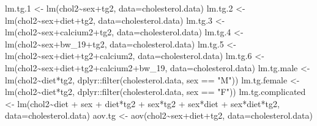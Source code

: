 \documentclass[
]{article}
\newenvironment{Shaded}{\begin{snugshade}}{\end{snugshade}}
\newcommand{\AttributeTok}[1]{\textcolor[rgb]{0.77,0.63,0.00}{#1}}
\newcommand{\FloatTok}[1]{\textcolor[rgb]{0.00,0.00,0.81}{#1}}
\newcommand{\FunctionTok}[1]{\textcolor[rgb]{0.00,0.00,0.00}{#1}}
\newcommand{\NormalTok}[1]{#1}
\newcommand{\OtherTok}[1]{\textcolor[rgb]{0.56,0.35,0.01}{#1}}
\newcommand{\SpecialCharTok}[1]{\textcolor[rgb]{0.00,0.00,0.00}{#1}}
\newcommand{\StringTok}[1]{\textcolor[rgb]{0.31,0.60,0.02}{#1}}
\begin{document}
\begin{Shaded}
\begin{Highlighting}[]
\NormalTok{lm.tg}\FloatTok{.1} \OtherTok{\textless{}{-}} \FunctionTok{lm}\NormalTok{(chol2}\SpecialCharTok{\textasciitilde{}}\NormalTok{sex}\SpecialCharTok{+}\NormalTok{tg2, }\AttributeTok{data=}\NormalTok{cholesterol.data)}
\NormalTok{lm.tg}\FloatTok{.2} \OtherTok{\textless{}{-}} \FunctionTok{lm}\NormalTok{(chol2}\SpecialCharTok{\textasciitilde{}}\NormalTok{sex}\SpecialCharTok{+}\NormalTok{diet}\SpecialCharTok{+}\NormalTok{tg2, }\AttributeTok{data=}\NormalTok{cholesterol.data)}
\NormalTok{lm.tg}\FloatTok{.3} \OtherTok{\textless{}{-}} \FunctionTok{lm}\NormalTok{(chol2}\SpecialCharTok{\textasciitilde{}}\NormalTok{sex}\SpecialCharTok{+}\NormalTok{calcium2}\SpecialCharTok{+}\NormalTok{tg2, }\AttributeTok{data=}\NormalTok{cholesterol.data)}
\NormalTok{lm.tg}\FloatTok{.4} \OtherTok{\textless{}{-}} \FunctionTok{lm}\NormalTok{(chol2}\SpecialCharTok{\textasciitilde{}}\NormalTok{sex}\SpecialCharTok{+}\NormalTok{bw\_19}\SpecialCharTok{+}\NormalTok{tg2, }\AttributeTok{data=}\NormalTok{cholesterol.data)}
\NormalTok{lm.tg}\FloatTok{.5} \OtherTok{\textless{}{-}} \FunctionTok{lm}\NormalTok{(chol2}\SpecialCharTok{\textasciitilde{}}\NormalTok{sex}\SpecialCharTok{+}\NormalTok{diet}\SpecialCharTok{+}\NormalTok{tg2}\SpecialCharTok{+}\NormalTok{calcium2, }\AttributeTok{data=}\NormalTok{cholesterol.data)}
\NormalTok{lm.tg}\FloatTok{.6} \OtherTok{\textless{}{-}} \FunctionTok{lm}\NormalTok{(chol2}\SpecialCharTok{\textasciitilde{}}\NormalTok{sex}\SpecialCharTok{+}\NormalTok{diet}\SpecialCharTok{+}\NormalTok{tg2}\SpecialCharTok{+}\NormalTok{calcium2}\SpecialCharTok{+}\NormalTok{bw\_19, }\AttributeTok{data=}\NormalTok{cholesterol.data)}
\NormalTok{lm.tg.male }\OtherTok{\textless{}{-}} \FunctionTok{lm}\NormalTok{(chol2}\SpecialCharTok{\textasciitilde{}}\NormalTok{diet}\SpecialCharTok{*}\NormalTok{tg2, dplyr}\SpecialCharTok{::}\FunctionTok{filter}\NormalTok{(cholesterol.data, sex }\SpecialCharTok{==} \StringTok{"M"}\NormalTok{))}
\NormalTok{lm.tg.female }\OtherTok{\textless{}{-}} \FunctionTok{lm}\NormalTok{(chol2}\SpecialCharTok{\textasciitilde{}}\NormalTok{diet}\SpecialCharTok{*}\NormalTok{tg2, dplyr}\SpecialCharTok{::}\FunctionTok{filter}\NormalTok{(cholesterol.data, sex }\SpecialCharTok{==} \StringTok{"F"}\NormalTok{))}
\NormalTok{lm.tg.complicated }\OtherTok{\textless{}{-}} \FunctionTok{lm}\NormalTok{(chol2}\SpecialCharTok{\textasciitilde{}}\NormalTok{diet }\SpecialCharTok{+}\NormalTok{ sex }\SpecialCharTok{+}\NormalTok{ diet}\SpecialCharTok{*}\NormalTok{tg2 }\SpecialCharTok{+}\NormalTok{ sex}\SpecialCharTok{*}\NormalTok{tg2 }\SpecialCharTok{+}\NormalTok{ sex}\SpecialCharTok{*}\NormalTok{diet }\SpecialCharTok{+}\NormalTok{ sex}\SpecialCharTok{*}\NormalTok{diet}\SpecialCharTok{*}\NormalTok{tg2, }\AttributeTok{data=}\NormalTok{cholesterol.data)}
\NormalTok{aov.tg }\OtherTok{\textless{}{-}} \FunctionTok{aov}\NormalTok{(chol2}\SpecialCharTok{\textasciitilde{}}\NormalTok{sex}\SpecialCharTok{+}\NormalTok{diet}\SpecialCharTok{+}\NormalTok{tg2, }\AttributeTok{data=}\NormalTok{cholesterol.data)}


\end{Highlighting}
\end{Shaded}
\end{document}
